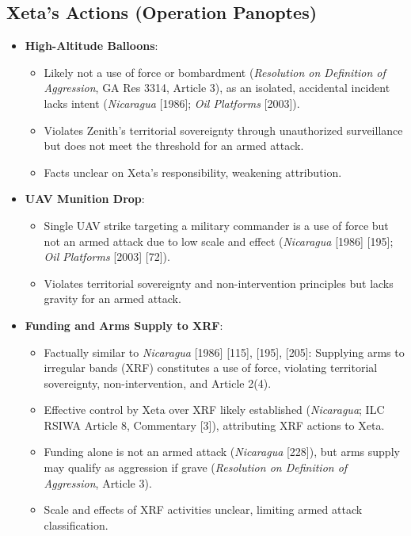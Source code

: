 \subsection{Xeta’s Actions (Operation Panoptes)}
\begin{itemize}
    \item \textbf{High-Altitude Balloons}:
    \begin{itemize}
        \item Likely not a use of force or bombardment (\textit{Resolution on Definition of Aggression}, GA Res 3314, Article 3), as an isolated, accidental incident lacks intent (\textit{Nicaragua} [1986]; \textit{Oil Platforms} [2003]).
        \item Violates Zenith’s territorial sovereignty through unauthorized surveillance but does not meet the threshold for an armed attack.
        \item Facts unclear on Xeta’s responsibility, weakening attribution.
    \end{itemize}
    \item \textbf{UAV Munition Drop}:
    \begin{itemize}
        \item Single UAV strike targeting a military commander is a use of force but not an armed attack due to low scale and effect (\textit{Nicaragua} [1986] [195]; \textit{Oil Platforms} [2003] [72]).
        \item Violates territorial sovereignty and non-intervention principles but lacks gravity for an armed attack.
    \end{itemize}
    \item \textbf{Funding and Arms Supply to XRF}:
    \begin{itemize}
        \item Factually similar to \textit{Nicaragua} [1986] [115], [195], [205]: Supplying arms to irregular bands (XRF) constitutes a use of force, violating territorial sovereignty, non-intervention, and Article 2(4).
        \item Effective control by Xeta over XRF likely established (\textit{Nicaragua}; ILC RSIWA Article 8, Commentary [3]), attributing XRF actions to Xeta.
        \item Funding alone is not an armed attack (\textit{Nicaragua} [228]), but arms supply may qualify as aggression if grave (\textit{Resolution on Definition of Aggression}, Article 3).
        \item Scale and effects of XRF activities unclear, limiting armed attack classification.

\end{itemize}
\end{itemize}
